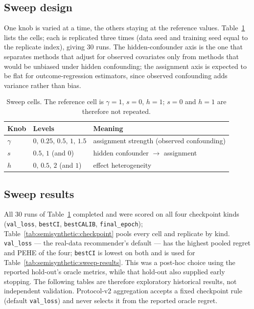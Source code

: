 \subsection{Sweep design}
\label{app:semisynthetic:sweep}

One knob is varied at a time, the others staying at the reference values.
Table~\ref{tab:semisynthetic:sweep} lists the cells; each is replicated three times (data seed
and training seed equal to the replicate index), giving $30$ runs. The hidden-confounder axis
is the one that separates methods that adjust for observed covariates only from methods that
would be unbiased under hidden confounding; the assignment axis is expected to be flat for
outcome-regression estimators, since observed confounding adds variance rather than bias.

\begin{table}[ht]
\centering\small
\caption{Sweep cells. The reference cell is $\gamma=1$, $s=0$, $h=1$; $s=0$ and $h=1$ are
therefore not repeated.}
\label{tab:semisynthetic:sweep}
\begin{tabular}{@{}lll@{}}
\toprule
Knob & Levels & Meaning \\
\midrule
$\gamma$ & $0,\,0.25,\,0.5,\,1,\,1.5$ & assignment strength (observed confounding) \\
$s$ & $0.5,\,1$ (and $0$) & hidden confounder $\to$ assignment \\
$h$ & $0,\,0.5,\,2$ (and $1$) & effect heterogeneity \\
\bottomrule
\end{tabular}
\end{table}

\subsection{Sweep results}
\label{app:semisynthetic:sweep-results}

All $30$ runs of Table~\ref{tab:semisynthetic:sweep} completed and were scored on all four
checkpoint kinds (\texttt{val\_loss}, \texttt{bestCI}, \texttt{bestCALIB}, \texttt{final\_epoch});
Table~\ref{tab:semisynthetic:checkpoint} pools every cell and replicate by kind. \texttt{val\_loss}
--- the real-data recommender's default --- has the highest pooled regret and PEHE of the four;
\texttt{bestCI} is lowest on both and is used for Table~\ref{tab:semisynthetic:sweep-results}.
This was a post-hoc choice using the reported hold-out's oracle metrics, while that hold-out
also supplied early stopping. The following tables are therefore exploratory historical
results, not independent validation. Protocol-v2 aggregation accepts a fixed checkpoint rule
(default \texttt{val\_loss}) and never selects it from the reported oracle regret.

